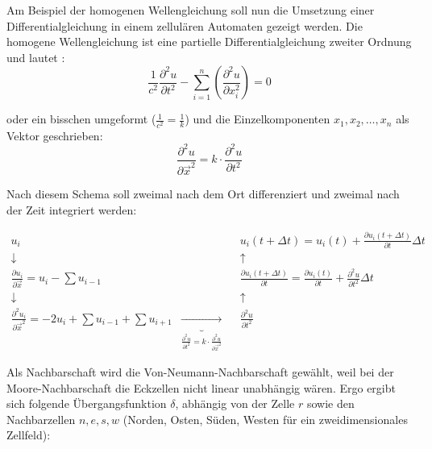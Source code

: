 \documentclass[11pt]{report} %
\theoremstyle{definition}
\begin{document}
Am Beispiel der homogenen Wellengleichung soll nun die Umsetzung einer Differentialgleichung in einem zellulären Automaten gezeigt werden. Die homogene Wellengleichung ist eine partielle Differentialgleichung zweiter Ordnung und lautet \cite{wiki:Wellengleichung}:
\[
\frac 1 {c^2} \frac{\partial^2 u}{\partial t^2}-\sum_{i=1}^{n} \left( \frac{\partial^2 u}{\partial x_i^2} \right)  = 0
\]

oder ein bisschen umgeformt ($\frac 1 {c^2} = \frac 1 k$) und die Einzelkomponenten $x_1, x_2, \dots, x_n$ als Vektor geschrieben:
\[
\frac {\partial^2 u} {\partial \vec x^2} = k \cdot \frac {\partial^2 u}{\partial t^2}
\]

Nach diesem Schema soll zweimal nach dem Ort differenziert und zweimal nach der Zeit integriert werden:

\begin{align*}
u_i &&& u_i(t+\Delta t) = u_i(t) +  \frac{\partial u_i(t+\Delta t)}{\partial t}\Delta t \\
\downarrow &&& \uparrow \\
\frac{\partial u_i}{\partial \vec x} = u_i - \sum u_{i-1} &&& \frac{\partial u_i(t+\Delta t)}{\partial t} = \frac{\partial u_i(t)}{\partial t} + \frac{\partial^2 u}{\partial t^2}\Delta t \\
\downarrow &&& \uparrow \\
\frac{\partial^2 u_i}{\partial \vec x^2} = -2u_i + \sum u_{i-1} + \sum u_{i+1} & \underbrace{\longrightarrow}_{\frac{\partial^2 u}{\partial t^2} = k\cdot \frac{\partial^2 u}{\partial \vec{x}^2}} && \frac{\partial^2 u}{\partial t^2}
\end{align*}

Als Nachbarschaft wird die Von-Neumann-Nachbarschaft gewählt, weil bei der Moore-Nachbarschaft die Eckzellen nicht linear unabhängig wären. Ergo ergibt sich folgende Übergangsfunktion $\delta$, abhängig von der Zelle $r$ sowie den Nachbarzellen $n, e, s, w$ (Norden, Osten, Süden, Westen für ein zweidimensionales Zellfeld):
\end{document}
